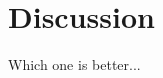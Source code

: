 \documentclass[12pt,fleqn,]{article}
\begin{document}
\begin{comment}
	Results of using baysian optimization with acquisition LCB: \\
	${hidden units: 3300, p: 0.20745359704991084, activation func: ReLU(), validation loss: 0.619}$
	${hidden units: 2900, p: 0.48178037973857923, activation func: Sigmoid(), validation loss: 0.6355}$
	${hidden units: 1700, p: 0.37725127529617486, activation func: ReLU6(), validation loss: 0.5955}$
	${hidden units: 3400, p: 0.5452219321218295, activation func: Sigmoid(), validation loss: 0.6275}$
	${hidden units: 1800, p: 0.47970862684081317, activation func: ReLU(), validation loss: 0.613}$
	${hidden units: 2900, p: 0.4817801130255398, activation func: Sigmoid(), validation loss: 0.634}$
	${hidden units: 2900, p: 0.4891192307830994, activation func: Sigmoid(), validation loss: 0.642}$
	${hidden units: 2900, p: 0.4947118739255611, activation func: Sigmoid(), validation loss: 0.6365}$
	${hidden units: 2900, p: 0.5834934845352279, activation func: Sigmoid(), validation loss: 0.651}$
	${hidden units: 2900, p: 0.6168247073529851, activation func: Sigmoid(), validation loss: 0.6365}$
	${hidden units: 2900, p: 1, activation func: Sigmoid(), validation loss: 0.0965}$
	${hidden units: 2900, p: 0.5604663271240786, activation func: Sigmoid(), validation loss: 0.635}$
	${hidden units: 2900, p: 0.5094736622953687, activation func: Sigmoid(), validation loss: 0.638}$
	${hidden units: 2900, p: 0.5849237064289087, activation func: Sigmoid(), validation loss: 0.629}$
	${hidden units: 2900, p: 0.5765931111057664, activation func: Sigmoid(), validation loss: 0.6265}$
	$bedste:  [2.90000000e+03 5.83493485e-01 3.00000000e+00]$	
\end{comment}


\section{Discussion}
Which one is better...
\end{document}

